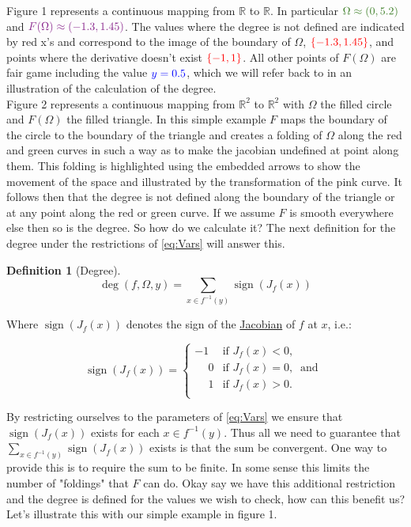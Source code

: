 \documentclass[11pt]{article}
\theoremstyle{plain}
\theoremstyle{definition}
\newtheorem{cdef}{Definition}[section]
\theoremstyle{remark}
\newcommand{\p}{\phantom{-}}
\begin{document}
Figure 1 represents a continuous mapping from $\mathbb{R}$ to $\mathbb{R}$. In particular ${\color{OliveGreen}\Omega\approx(0,5.2)}$ and ${\color{Fuchsia}F(\Omega)\approx(-1.3,1.45)}$. The values where the degree is not defined are indicated by red x's and correspond to the image of the boundary of $\Omega$, ${\color{red}\{-1.3,1.45\}}$, and points where the derivative doesn't exist ${\color{red}\{-1,1\}}$. All other points of $F(\Omega)$ are fair game including the value ${\color{blue}y=0.5}$, which we will refer back to in an illustration of the calculation of the degree.\\
Figure 2 represents a continuous mapping from $\mathbb{R}^2$ to $\mathbb{R}^2$ with $\Omega$ the filled circle and $F(\Omega)$ the filled triangle. In this simple example $F$ maps the boundary of the circle to the boundary of the triangle and creates a folding of $\Omega$ along the red and green curves in such a way as to make the jacobian undefined at point along them. This folding is highlighted using the embedded arrows to show the movement of the space and illustrated by the transformation of the pink curve. It follows then that the degree is not defined along the boundary of the triangle or at any point along the red or green curve. If we assume $F$ is smooth everywhere else then so is the degree. So how do we calculate it? The next definition for the degree under the restrictions of \eqref{eq:Vars} will answer this. 


\begin{cdef}[Degree]\label{ddef} \ \\
$$\operatorname{deg}\left(f,\Omega,y\right)=\sum\limits_{x\in f^{-1}(y)}\operatorname{sign}\left(J_f(x)\right)$$
\end{cdef}

Where $\operatorname{sign}\left(J_f(x)\right)$ denotes the sign of the \href{https://en.wikipedia.org/wiki/Jacobian_matrix_and_determinant}{Jacobian} of $f$ at $x$, i.e.:

\[\operatorname{sign}\left(J_f(x)\right)=   \left\{
\begin{array}{ll}
      -1   & \mbox{if } J_f(x)< 0, \\
      \p 0 & \mbox{if } J_f(x)= 0,~\mbox{ and } \\
      \p 1 & \mbox{if } J_f(x)> 0. \\
\end{array} 
\right. \]

By restricting ourselves to the parameters of \eqref{eq:Vars} we ensure that $\operatorname{sign}\left(J_f(x)\right)$ exists for each $x\in f^{-1}(y)$.
Thus all we need to guarantee that $\sum\limits_{x\in f^{-1}(y)}\operatorname{sign}\left(J_f(x)\right)$ exists is that the sum be convergent. One way to provide this is to require the sum to be finite. In some sense this limits the number of "foldings" that $F$ can do. Okay say we have this additional restriction and the degree is defined for the values we wish to check, how can this benefit us? Let's illustrate this with our simple example in figure 1.
\end{document}
